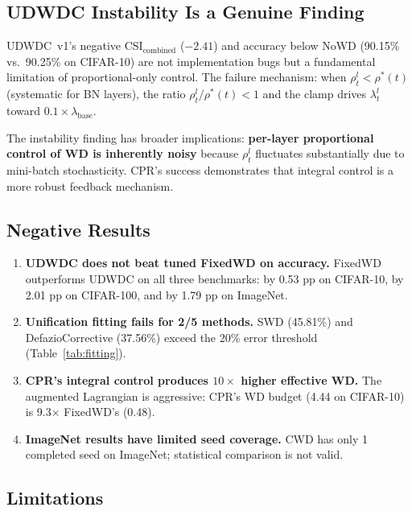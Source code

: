 \documentclass{article}
\begin{document}
\subsection{UDWDC Instability Is a Genuine Finding}

UDWDC~v1's negative $\text{CSI}_{\text{combined}}$ ($-2.41$) and accuracy below NoWD (90.15\% vs.\ 90.25\% on CIFAR-10) are not implementation bugs but a fundamental limitation of proportional-only control. The failure mechanism: when $\rho_t^l < \rho^*(t)$ (systematic for BN layers), the ratio $\rho_t^l / \rho^*(t) < 1$ and the clamp drives $\lambda_t^l$ toward $0.1 \times \lambda_{\text{base}}$.

The instability finding has broader implications: \textbf{per-layer proportional control of WD is inherently noisy} because $\rho_t^l$ fluctuates substantially due to mini-batch stochasticity. CPR's success demonstrates that integral control is a more robust feedback mechanism.

\subsection{Negative Results}

\begin{enumerate}
\item \textbf{UDWDC does not beat tuned FixedWD on accuracy.} FixedWD outperforms UDWDC on all three benchmarks: by 0.53 pp on CIFAR-10, by 2.01 pp on CIFAR-100, and by 1.79 pp on ImageNet.

\item \textbf{Unification fitting fails for 2/5 methods.} SWD (45.81\%) and DefazioCorrective (37.56\%) exceed the 20\% error threshold (Table~\ref{tab:fitting}).

\item \textbf{CPR's integral control produces $10\times$ higher effective WD.} The augmented Lagrangian is aggressive: CPR's WD budget (4.44 on CIFAR-10) is 9.3$\times$ FixedWD's (0.48).

\item \textbf{ImageNet results have limited seed coverage.} CWD has only 1 completed seed on ImageNet; statistical comparison is not valid.
\end{enumerate}

\subsection{Limitations}
\end{document}
